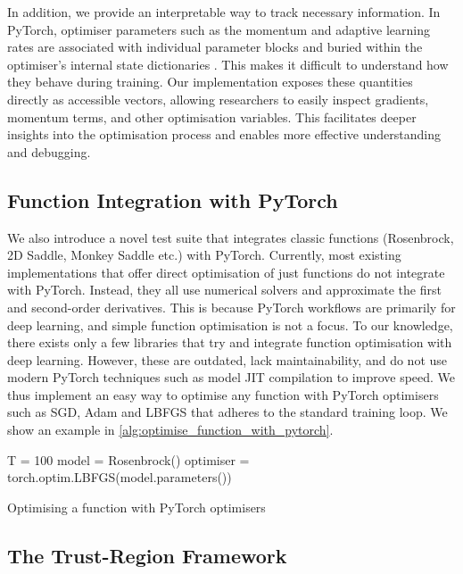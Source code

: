 In addition, we provide an interpretable way to track necessary information. In PyTorch, optimiser parameters such as the momentum and adaptive learning rates are associated with individual parameter blocks and buried within the optimiser's internal state dictionaries \citep{pytorch}. This makes it difficult to understand how they behave during training. Our implementation exposes these quantities directly as accessible vectors, allowing researchers to easily inspect gradients, momentum terms, and other optimisation variables. This facilitates deeper insights into the optimisation process and enables more effective understanding and debugging.

\subsection{Function Integration with PyTorch}
\label{ssec:function_integration_with_pytorch}

We also introduce a novel test suite that integrates classic functions (Rosenbrock, 2D Saddle, Monkey Saddle etc.) with PyTorch. Currently, most existing implementations that offer direct optimisation of just functions do not integrate with PyTorch. Instead, they all use numerical solvers and approximate the first and second-order derivatives. This is because PyTorch workflows are primarily for deep learning, and simple function optimisation is not a focus. To our knowledge, there exists only a few libraries that try and integrate function optimisation with deep learning. However, these are outdated, lack maintainability, and do not use modern PyTorch techniques such as model JIT compilation to improve speed. We thus implement an easy way to optimise any function with PyTorch optimisers such as SGD, Adam and LBFGS that adheres to the standard training loop. We show an example in \cref{alg:optimise_function_with_pytorch}.

\begin{algorithm}[h]
    \small
    \DontPrintSemicolon
    T = 100\;
    model = Rosenbrock()\;
    optimiser = torch.optim.LBFGS(model.parameters())\;
    \caption{Optimising a function with PyTorch optimisers}
    \label{alg:optimise_function_with_pytorch}
\end{algorithm}


\subsection{The Trust-Region Framework}
\label{ssec:the_trust_region_framework}

